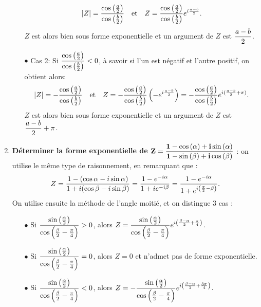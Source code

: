 \documentclass[a4paper, 11pt]{article}
\begin{document}
\begin{correction}
\begin{enumerate}
\begin{itemize}
$$|Z|=\displaystyle\frac{ \cos{\left( \frac{a}{2}\right)}  }{   \cos{\left( \frac{b}{2}\right)}  } \quad \hbox{et}\quad Z=\displaystyle\frac{ \cos{\left( \frac{a}{2}\right)}  }{   \cos{\left( \frac{b}{2}\right)}  } e^{i\frac{a-b}{2}}.$$
$Z$ est alors bien sous forme exponentielle et un argument de $Z$ est $\displaystyle\frac{a-b}{2}$.
\item[$\bullet$] Cas 2: Si $ \displaystyle\frac{ \cos{\left( \frac{a}{2}\right)}  }{   \cos{\left( \frac{b}{2}\right)}  } <0$, \`{a} savoir si l'un est n\'egatif et l'autre positif, on obtient alors:
$$|Z|=-\displaystyle\frac{ \cos{\left( \frac{a}{2}\right)}  }{   \cos{\left( \frac{b}{2}\right)}  } \quad \hbox{et}\quad Z=-\displaystyle\frac{ \cos{\left( \frac{a}{2}\right)}  }{   \cos{\left( \frac{b}{2}\right)}  } \left(-e^{i\frac{a-b}{2}}\right)=-\displaystyle\frac{ \cos{\left( \frac{a}{2}\right)}  }{   \cos{\left( \frac{b}{2}\right)}  } 
e^{i(\frac{a-b}{2}+\pi)}.$$
$Z$ est alors bien sous forme exponentielle et un argument de $Z$ est $\displaystyle\frac{a-b}{2}+\pi$.
\end{itemize}
\item \textbf{D\'eterminer la forme exponentielle de $\mathbf{Z=\displaystyle\frac{1-\cos{(\alpha)} +i\sin{(\alpha)} }{1-\sin{(\beta)} +i\cos{(\beta)}}}$} : on utilise le m\^{e}me type de raisonnement, en remarquant que :
$$Z=\displaystyle\frac{1-(\cos \alpha -i\sin \alpha) }{1+i(\cos \beta - i \sin \beta)} = \frac{1-e^{-i\alpha}}{1+ie^{-i\beta}} =  \frac{1-e^{-i\alpha}}{1+e^{i\left(\frac{\pi}{2} - \beta\right)}}.$$
On utilise ensuite la m\'ethode de l'angle moiti\'e, et on distingue 3 cas :
\begin{itemize}
\item[$\bullet$] Si $\displaystyle \frac{\sin\left(\frac{\alpha}{2}\right)}{\cos \left( \frac{\beta}{2}-\frac{\pi}{4}\right)} >0$, alors $Z = \displaystyle \frac{\sin\left(\frac{\alpha}{2}\right)}{\cos \left( \frac{\beta}{2}-\frac{\pi}{4}\right)} e^{i\left(\frac{\beta-\alpha}{2}+\frac{\pi}{4}\right)}$.
\item[$\bullet$] Si $\displaystyle \frac{\sin\left(\frac{\alpha}{2}\right)}{\cos \left( \frac{\beta}{2}-\frac{\pi}{4}\right)} =0$, alors $Z=0$ et n'admet pas de forme exponentielle.
\item[$\bullet$] Si $\displaystyle \frac{\sin\left(\frac{\alpha}{2}\right)}{\cos \left( \frac{\beta}{2}-\frac{\pi}{4}\right)} <0$, alors  $Z = \displaystyle -\frac{\sin\left(\frac{\alpha}{2}\right)}{\cos \left( \frac{\beta}{2}-\frac{\pi}{4}\right)} e^{i\left(\frac{\beta-\alpha}{2}+\frac{3\pi}{4}\right)}$.
\end{itemize}
\end{enumerate}
\end{correction}
\end{document}

